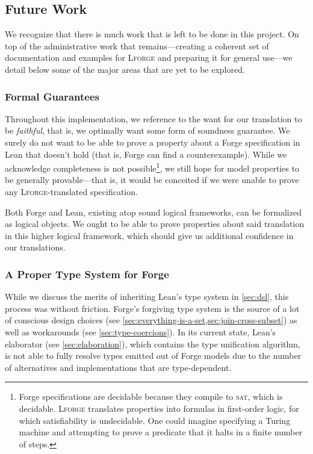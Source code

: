 \subsection{Future Work}\label{sec:future-work}

We recognize that there is much work that is left to be done in this project. On top of the administrative work that remains---creating a coherent set of documentation and examples for \textsc{Lforge} and preparing it for general use---we detail below some of the major areas that are yet to be explored. 

\subsubsection{Formal Guarantees}

Throughout this implementation, we reference to the want for our translation to be \emph{faithful}, that is, we optimally want some form of soundness guarantee. We surely do not want to be able to prove a property about a Forge specification in Lean that doesn't hold (that is, Forge can find a counterexample). While we acknowledge completeness is not possible\footnote{Forge specifications are decidable because they compile to \textsc{sat}, which is decidable. \textsc{Lforge} translates properties into formulas in first-order logic, for which satisfiability is undecidable. One could imagine specifying a Turing machine and attempting to prove a predicate that it halts in a finite number of steps.}, we still hope for model properties to be generally provable---that is, it would be conceited if we were unable to prove any \textsc{Lforge}-translated specification. 

Both Forge and Lean, existing atop sound logical frameworks, can be formalized as logical objects. We ought to be able to prove properties about said translation in this higher logical framework, which should give us additional confidence in our translations. 

\subsubsection{A Proper Type System for Forge}

While we discuss the merits of inheriting Lean's type system in \cref{sec:dsl}, this process was without friction. Forge's forgiving type system is the source of a lot of conscious design choices (see \cref{sec:everything-is-a-set,sec:join-cross-subset}) as well as workarounds (see \cref{sec:type-coercions}). In its current state, Lean's elaborator (see \cref{sec:elaboration}), which contains the type unification algorithm, is not able to fully resolve types emitted out of Forge models due to the number of alternatives and implementations that are type-dependent. 

